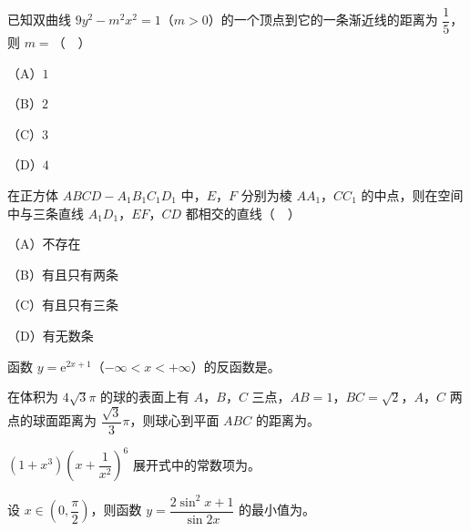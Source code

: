 \begin{question}
已知双曲线 $9y^2-m^2x^2=1$（$m>0$）的一个顶点到它的一条渐近线的距离为 $\dfrac15$，则 $m=$（　）

（A）$1$

（B）$2$

（C）$3$

（D）$4$

\end{question}
\begin{question}
在正方体 $ABCD-A_1B_1C_1D_1$ 中，$E$，$F$ 分别为棱 $AA_1$，$CC_1$ 的中点，则在空间中与三条直线 $A_1D_1$，$EF$，$CD$ 都相交的直线（　）

（A）不存在

（B）有且只有两条

（C）有且只有三条

（D）有无数条

\end{question}

\begin{question}
函数 $y=\mathrm e^{2x+1}$（$-\infty<x<+\infty$）的反函数是\gkblank{}。

\end{question}
\begin{question}
在体积为 $4\sqrt3\pi$ 的球的表面上有 $A$，$B$，$C$ 三点，$AB=1$，$BC=\sqrt2$，$A$，$C$ 两点的球面距离为 $\dfrac{\sqrt3}{3}\pi$，则球心到平面 $ABC$ 的距离为\gkblank{}。

\end{question}
\begin{question}
$\left(1+x^3\right)\left(x+\dfrac1{x^2}\right)^6$ 展开式中的常数项为\gkblank{}。

\end{question}
\begin{question}
设 $x\in\left(0,\dfrac{\pi}{2}\right)$，则函数 $y=\dfrac{2\sin^2x+1}{\sin2x}$ 的最小值为\gkblank{}。

\end{question}

